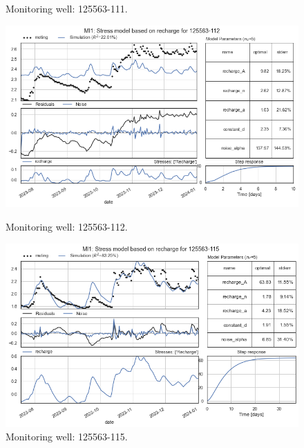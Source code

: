\begin{figure}[htbp]
\begin{minipage}{0.32\textwidth}
        \caption{Monitoring well: 125563-111.}
        \label{SM: 125563-111}
    \end{minipage}
\end{figure}

\begin{figure}[htbp]
    \centering
    \begin{minipage}{0.32\textwidth}
        \centering
        \includegraphics[width=\linewidth]{frontmatter/Heijplaat-fig/13.png}
        \caption{Monitoring well: 125563-112.}
        \label{SM: 125563-112}
    \end{minipage}
    \hfill
    \begin{minipage}{0.32\textwidth}
        \centering
        \includegraphics[width=\linewidth]{frontmatter/Heijplaat-fig/ml1125563115.png}
        \caption{Monitoring well: 125563-115.}
        \label{SM: 125563-115}
    \end{minipage}  
\end{figure}\\
